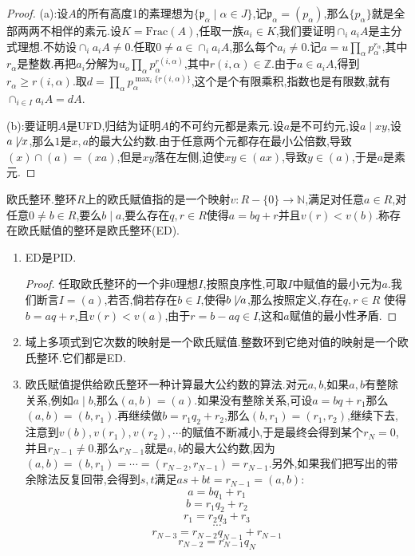 \begin{enumerate}
\begin{proof}
    	(a):设$A$的所有高度1的素理想为$\{\mathfrak{p}_{\alpha}\mid\alpha\in J\}$,记$\mathfrak{p}_{\alpha}=(p_{\alpha})$,那么$\{p_{\alpha}\}$就是全部两两不相伴的素元.设$K=\mathrm{Frac}(A)$,任取一族$a_i\in K$,我们要证明$\cap_ia_iA$是主分式理想.不妨设$\cap_ia_iA\not=0$.任取$0\not=a\in\cap_ia_iA$,那么每个$a_i\not=0$.记$a=u\prod_{\alpha}p_{\alpha}^{r_{\alpha}}$,其中$r_{\alpha}$是整数.再把$a_i$分解为$u_o\prod_{\alpha}p_{\alpha}^{r(i,\alpha)}$,其中$r(i,\alpha)\in\mathbb{Z}$.由于$a\in a_iA$,得到$r_{\alpha}\ge r(i,\alpha)$.取$d=\prod_{\alpha}p_{\alpha}^{\max_i\{r(i,\alpha)\}}$,这个是个有限乘积,指数也是有限数,就有$\cap_{i\in I}a_iA=dA$.
    	
    	\qquad
    	
    	(b):要证明$A$是UFD,归结为证明$A$的不可约元都是素元.设$a$是不可约元,设$a\mid xy$,设$a\not\mid x$,那么$1$是$x,a$的最大公约数.由于任意两个元都存在最小公倍数,导致$(x)\cap(a)=(xa)$,但是$xy$落在左侧,迫使$xy\in(ax)$,导致$y\in(a)$,于是$a$是素元.
    \end{proof}
\end{enumerate}

欧氏整环.整环$R$上的欧氏赋值指的是一个映射$v:R-\{0\}\to\mathbb{N}$,满足对任意$a\in R$,对任意$0\not=b\in R$,要么$b\mid a$,要么存在$q,r\in R$使得$a=bq+r$并且$v(r)<v(b)$.称存在欧氏赋值的整环是欧氏整环(ED).
\begin{enumerate}
	\item ED是PID.
	\begin{proof}
		
		任取欧氏整环的一个非0理想$I$,按照良序性,可取$I$中赋值的最小元为$a$.我们断言$I=(a)$,若否,倘若存在$b\in I$,使得$b\not\mid a$,那么按照定义,存在$q,r\in R$ 使得$b=aq+r$,且$v(r)<v(a)$,由于$r=b-aq\in I$,这和$a$赋值的最小性矛盾.
	\end{proof}
    \item 域上多项式到它次数的映射是一个欧氏赋值.整数环到它绝对值的映射是一个欧氏整环.它们都是ED.
    \item 欧氏赋值提供给欧氏整环一种计算最大公约数的算法.对元$a,b$,如果$a,b$有整除关系,例如$a\mid b$,那么$(a,b)=(a)$.如果没有整除关系,可设$a=bq+r_1$那么$(a,b)=(b,r_1)$.再继续做$b=r_1q_2+r_2$,那么$(b,r_1)=(r_1,r_2)$,继续下去,注意到$v(b),v(r_1),v(r_2),\cdots$的赋值不断减小,于是最终会得到某个$r_N=0$,并且$r_{N-1}\not=0$.那么$r_{N-1}$就是$a,b$的最大公约数,因为$(a,b)=(b,r_1)=\cdots=(r_{N-2},r_{N-1})=r_{N-1}$.另外,如果我们把写出的带余除法反复回带,会得到$s,t$满足$as+bt=r_{N-1}=(a,b)$:
    $$a=bq_1+r_1$$
    $$b=r_1q_2+r_2$$
    $$r_1=r_2q_3+r_3$$
    $$\cdots$$
    $$r_{N-3}=r_{N-2}q_{N-1}+r_{N-1}$$
    $$r_{N-2}=r_{N-1}q_N$$
\end{enumerate}

